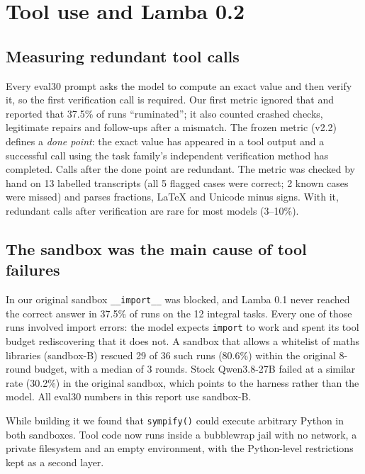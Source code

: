 \documentclass[11pt]{article}
\begin{document}
\section{Tool use and Lamba 0.2}
\label{sec:tools}

\subsection{Measuring redundant tool calls}

Every eval30 prompt asks the model to compute an exact value and then verify it, so the first verification call is required. Our first metric ignored that and reported that 37.5\% of runs ``ruminated''; it also counted crashed checks, legitimate repairs and follow-ups after a mismatch. The frozen metric (v2.2) defines a \emph{done point}: the exact value has appeared in a tool output and a successful call using the task family's independent verification method has completed. Calls after the done point are redundant. The metric was checked by hand on 13 labelled transcripts (all 5 flagged cases were correct; 2 known cases were missed) and parses fractions, LaTeX and Unicode minus signs. With it, redundant calls after verification are rare for most models (3--10\%).

\subsection{The sandbox was the main cause of tool failures}

In our original sandbox \verb|__import__| was blocked, and Lamba 0.1 never reached the correct answer in 37.5\% of runs on the 12 integral tasks. Every one of those runs involved import errors: the model expects \texttt{import} to work and spent its tool budget rediscovering that it does not. A sandbox that allows a whitelist of maths libraries (sandbox-B) rescued 29 of 36 such runs (80.6\%) within the original 8-round budget, with a median of 3 rounds. Stock Qwen3.8-27B failed at a similar rate (30.2\%) in the original sandbox, which points to the harness rather than the model. All eval30 numbers in this report use sandbox-B.

While building it we found that \texttt{sympify()} could execute arbitrary Python in both sandboxes. Tool code now runs inside a bubblewrap jail \citep{bwrap} with no network, a private filesystem and an empty environment, with the Python-level restrictions kept as a second layer.
\end{document}
